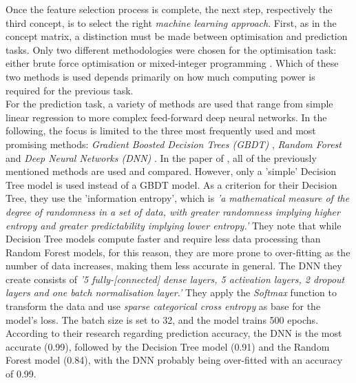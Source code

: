 Once the feature selection process is complete, the next step, respectively the third concept, is to select the right \emph{machine learning approach}. First, as in the concept matrix, a distinction must be made between optimisation and prediction tasks. Only two different methodologies were chosen for the optimisation task: either brute force optimisation \parencite{landers_machine_2017} or mixed-integer programming \parencite{becker_analytical_2016,edwards_analyzing_2018, belien_optimization_2017,bonomo_mathematical_2014,matthews_competing_2012}. Which of these two methods is used depends primarily on how much computing power is required for the previous task. \\
\indent For the prediction task, a variety of methods are used that range from simple linear regression to more complex feed-forward deep neural networks. In the following, the focus is limited to the three most frequently used and most promising methods:  \emph{Gradient Boosted Decision Trees (GBDT)} \parencite{landers_machine_2017,deng_analysis_2020}, \emph{Random Forest} \parencite{deng_analysis_2020,shah_poisson_2021,demediuk_performance_2021,bhateja_analysis_2021} and \emph{Deep Neural Networks (DNN)} \parencite{bhateja_analysis_2021,skinner_method_2015,deng_analysis_2020,lutz_fantasy_2015,landers_machine_2017}. In the paper of \citet{deng_analysis_2020}, all of the previously mentioned methods are used and compared. However, only a 'simple' Decision Tree model is used instead of a GBDT model. As a criterion for their Decision Tree, they use the 'information entropy', which is \emph{'a mathematical measure of the degree of randomness in a set of data, with greater randomness implying higher entropy and greater predictability implying lower entropy.'} \parencite[, p. 4]{deng_analysis_2020} They note that while Decision Tree models compute faster and require less data processing than Random Forest models, for this reason, they are more prone to over-fitting as the number of data increases, making them less accurate in general. The DNN they create consists of \emph{'5 fully-[connected] dense layers, 5 activation layers, 2 dropout layers and one batch normalisation layer.'} \parencite[, p. 4]{deng_analysis_2020} They apply the \emph{Softmax} function to transform the data and use \emph{sparse categorical cross entropy} as base for the model's loss. The batch size is set to 32, and the model trains 500 epochs. According to their research regarding prediction accuracy, the DNN is the most accurate (0.99), followed by the Decision Tree model (0.91) and the Random Forest model (0.84), with the DNN probably being over-fitted with an accuracy of 0.99. \\
